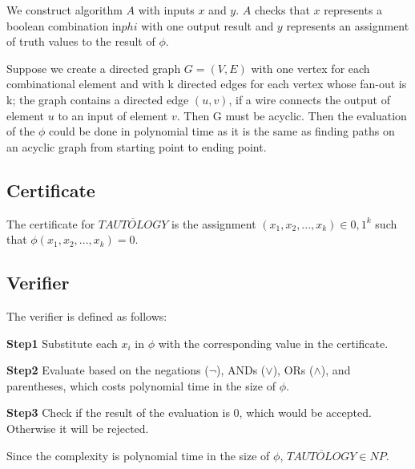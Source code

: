 \documentclass[12pt]{article}
\begin{document}
 
We construct algorithm $A$ with inputs $x$ and $y$.  $A$ checks that $x$ represents a boolean combination in$phi$  with one output result and $y$ represents an assignment of truth values to the result of $\phi$.

Suppose we create a directed graph $G=(V,E)$ with one vertex for each combinational element and with k directed edges for each vertex whose fan-out is k; the graph contains a directed edge $(u,v)$, if a wire connects the output of element $u$ to an input of element $v$. Then G must be acyclic. Then the evaluation of the $\phi$ could be done in polynomial time as it is the same as finding paths on an acyclic graph from starting point to ending point.

\subsection{Certificate}
The certificate for $\overline{TAUTOLOGY}$ is the assignment $(x_1,x_2,...,x_k) \in {0,1}^k$ such that $\phi(x_1,x_2,...,x_k) = 0$.

\subsection{Verifier}
The verifier is defined as follows:

\textbf{Step1} Substitute each $x_i$ in $\phi$ with the corresponding value in the certificate.

\textbf{Step2} Evaluate based on the negations ($\neg$), ANDs ($\vee$), ORs ($\wedge$), and parentheses, which costs polynomial time in the size of $\phi$.

\textbf{Step3} Check if the result of the evaluation is 0, which would be accepted. Otherwise it will be rejected. 

Since the complexity is polynomial time in the size of $\phi$, $\overline{TAUTOLOGY} \in NP$.
\end{document}
